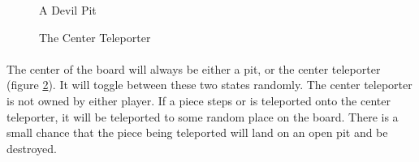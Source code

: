 \begin{figure}[htb]
	\caption{A Devil Pit}
	\label{devil}
\end{figure}

\begin{figure}[htb]
	\caption{The Center Teleporter}
	\label{centerpit}
\end{figure}

\paragraph[]{}
The center of the board will always be either a pit, or the center
teleporter (figure \ref{centerpit}).  It will toggle between these two
states randomly.  The center teleporter is not owned by either player.
If a piece steps or is teleported onto the center teleporter, it will
be teleported to some random place on the board.  There is a small
chance that the piece being teleported will land on an open pit and be
destroyed.


